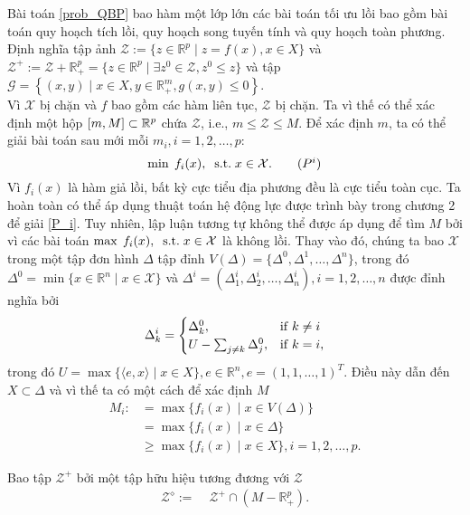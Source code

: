 Bài toán \ref{prob_QBP}
bao hàm một lớp lớn các bài toán tối ưu lồi bao gồm bài toán quy hoạch tích lồi, quy hoạch song tuyến tính và quy hoạch toàn phương. \\
\indent Định nghĩa tập ảnh $\mathcal{Z}:=\{z\in\mathbb{R}^{p}\mid z=f(x),x\in X\}$ và $\mathcal{Z}^{+}:=\mathcal{Z}+\mathbb{R}_{+}^{p}=\{z\in\mathbb{R}^{p}\mid\exists z^{0}\in\mathcal{Z},z^{0}\leq z\}$ và tập $\mathcal{G}=\left\{(x,y)\mid x\in X,y\in\mathbb{R}_{+}^{m},g(x,y)\le0\right\}$.\\
\indent Vì $\mathcal{X}$ bị chặn và $f$ bao gồm các hàm liên tục, $\mathcal{Z}$ bị chặn. Ta vì thế có thể xác định một hộp $[m,M] \subset \mathbb{R}^p$ chứa $\mathcal{Z}$, i.e., $m\leq\mathcal{Z}\leq M$. Để xác định $m$, ta có thể giải bài toán sau mới mỗi $m_{i},i=1,2,\dots,p$:
\begin{equation}\label{P_i}
    \min\;f_{i}(x),\;\;{\rm s.t.}\;x\in \mathcal{X}.    \tag*{\ensuremath{(P^i)}}
\end{equation}
Vì $f_{i}(x)$ là hàm giả lồi, bất kỳ cực tiểu địa phương đều là cực tiểu toàn cục. Ta hoàn toàn có thể áp dụng thuật toán hệ động lực được trình bày trong chương 2 để giải \ref{P_i}. Tuy nhiên, lập luận tương tự không thể được áp dụng để tìm $M$ bởi vì các bài toán
$\max\;f_{i}(x),\;\;{\rm s.t.}\;x\in \mathcal{X}$ là không lồi. Thay vào đó, chúng ta bao $\mathcal{X}$ trong một tập đơn hình $\Delta$ tập đỉnh
$V(\Delta)=\{\Delta^{0},\Delta^{1},\dots,\Delta^{n}\}$, trong đó $\Delta^{0}=\min\{x\in\mathbb{R}^{n}\mid x\in \mathcal{X}\}$
và $\Delta^{i}=(\Delta_{1}^{i},\Delta_{2}^{i},\dots,\Delta_{n}^{i}),i=1,2,\dots,n$ được đỉnh nghĩa bởi
\[
\Delta_{k}^{i}=\begin{cases}
\Delta_{k}^{0}, & {\rm if}\;k\neq i\\
U-\sum_{j\neq k}\Delta_{j}^{0}, & {\rm if}\;k=i,
\end{cases}
\]
trong đó $U=\max\{\langle e,x\rangle\mid x\in X\},e\in\mathbb{R}^{n},e=(1,1,\dots,1)^{T}$. Điều này dẫn đến $X\subset\Delta$ và vì thế ta có một cách để xác định $M$
\begin{align*}
M_{i}: & =\max\{f_{i}(x)\mid x\in V(\Delta)\}\\
 & =\max\{f_{i}(x)\mid x\in\Delta\}\\
 & \geq\max\{f_{i}(x)\mid x\in X\},i=1,2,\dots,p.
\end{align*}

Bao tập $\mathcal{Z}^{+}$ bởi một tập hữu hiệu tương đương với $\mathcal{Z}$
\begin{align*}
\mathcal{Z}^{\diamond}:=\; & \mathcal{Z}^{+}\cap(M-\mathbb{R}_{+}^{p}).
\end{align*}

